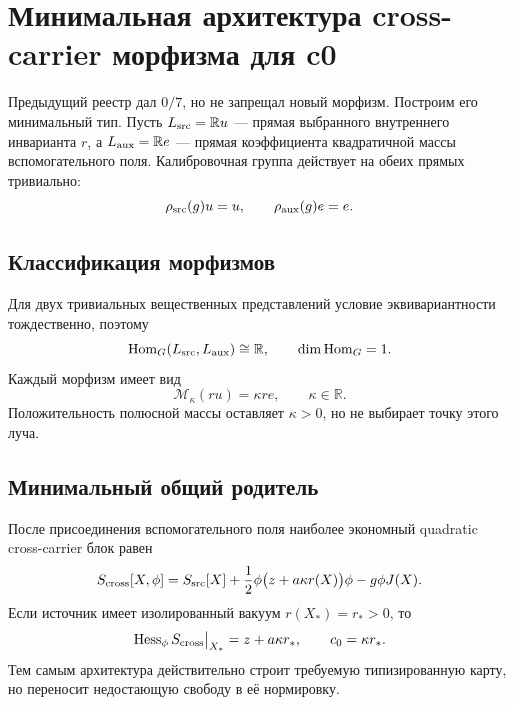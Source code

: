 \chapter{Минимальная архитектура cross-carrier морфизма для c0}
\label{ch:v8-baryon-c0-minimal-cross-carrier-morphism-architecture-gate}

Предыдущий реестр дал $0/7$, но не запрещал новый морфизм. Построим его
минимальный тип. Пусть $L_{\rm src}=\mathbb R u$ --- прямая выбранного
внутреннего инварианта $r$, а $L_{\rm aux}=\mathbb R e$ --- прямая
коэффициента квадратичной массы вспомогательного поля. Калибровочная группа
действует на обеих прямых тривиально:
\begin{equation}
 \rho_{\rm src}(g)u=u,
 \qquad
 \rho_{\rm aux}(g)e=e.
 \label{eq:v8-baryon-c0-trivial-line-actions}
\end{equation}

\section{Классификация морфизмов}

Для двух тривиальных вещественных представлений условие эквивариантности
тождественно, поэтому
\begin{equation}
 \operatorname{Hom}_G(L_{\rm src},L_{\rm aux})\cong\mathbb R,
 \qquad
 \dim\operatorname{Hom}_G=1.
 \label{eq:v8-baryon-c0-equivariant-hom-space}
\end{equation}
Каждый морфизм имеет вид
\begin{equation}
 \mathcal M_\kappa(ru)=\kappa r e,
 \qquad \kappa\in\mathbb R.
 \label{eq:v8-baryon-c0-morphism-family}
\end{equation}
Положительность полюсной массы оставляет $\kappa>0$, но не выбирает точку
этого луча.

\section{Минимальный общий родитель}

После присоединения вспомогательного поля наиболее экономный quadratic
cross-carrier блок равен
\begin{equation}
 S_{\rm cross}[X,\phi]
 =S_{\rm src}[X]
 +\frac12\phi\bigl(z+a\kappa r(X)\bigr)\phi-g\phi J(X).
 \label{eq:v8-baryon-c0-minimal-cross-parent}
\end{equation}
Если источник имеет изолированный вакуум $r(X_*)=r_*>0$, то
\begin{equation}
 \operatorname{Hess}_\phi S_{\rm cross}\big|_{X_*}=z+a\kappa r_*,
 \qquad
 c_0=\kappa r_*.
 \label{eq:v8-baryon-c0-cross-parent-hessian}
\end{equation}
Тем самым архитектура действительно строит требуемую типизированную карту,
но переносит недостающую свободу в её нормировку.

